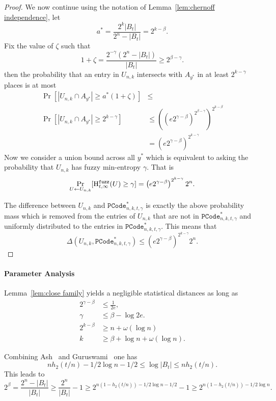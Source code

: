 \begin{proof}
\noindent
We now continue using the notation of Lemma~\ref{lem:chernoff independence}, let 
\[
a^* =\frac{2^k|B_t|}{2^n - |B_t|}=2^{k-\beta}.
\]
Fix the value of $\zeta$ such that 
\[1+\zeta = \frac{2^{-\gamma}(2^n - |B_t|)}{|B_t|} \ge 2^{\beta-\gamma}. \]
then the probability that an entry in $U_{n,k}$ intersects with $A_{y^*}$ in at least $2^{k-\gamma}$ places is at most 
\begin{align*}
\Pr[|U_{n,k} \cap A_{y^*}| \ge a^*(1+\zeta)] &\le \\
\Pr[| U_{n,k} \cap A_{y^*} | \ge 2^{k-\gamma}] &\le \left(\left(e2^{\gamma-\beta}\right)^{2^{\beta-\gamma}}\right)^{2^{k-\beta}} \\&= \left(e2^{\gamma-\beta}\right)^{2^{k-\gamma}}
\end{align*}
Now we consider a union bound across all $y^*$ which is equivalent to asking the probability that $U_{n,k}$ has fuzzy min-entropy $\gamma$.  That is
\[
\Pr_{U\leftarrow U_{n,k}}[\mathrm{H}^{\mathtt{fuzz}}_{t,\infty}(U)\ge \gamma] = \left(e2^{\gamma-\beta}\right)^{2^{k-\gamma}}2^n.
\]

The difference between $U_{n,k}$ and $\mathtt{PCode}_{n, k, t, \gamma}^{*}$ is exactly the above probability mass which is removed from the entries of $U_{n,k}$ that are not in $\mathtt{PCode}_{n, k, t, \gamma}^{*}$ and uniformly distributed to the entries in $\mathtt{PCode}_{n, k, t, \gamma}^{*}$.  This means that 
\[
\Delta(U_{n,k}, \mathtt{PCode}_{n, k, t, \gamma}^{*}) \le \left(e2^{\gamma-\beta}\right)^{2^{k-\gamma}}2^n.
\]
\end{proof}

\paragraph{Parameter Analysis}
 Lemma~\ref{lem:close family} yields a negligible statistical distances as long as 
\begin{align*}
2^{\gamma - \beta} &\le \frac{1}{2e},\\
 \gamma &\le \beta -\log{2e}.\\
2^{k-\beta}&\ge n+\omega(\log n)\\
k &\ge \beta + \log{n+ \omega(\log{n})}.
\end{align*}

\noindent
Combining Ash~\cite[Lemma 4.7.2, Equation 4.7.5, p. 115]{ash2012information} and Guruswami~\cite{venkatLecture} one has
\[ nh_2(t/n)  -1/2\log{n} - 1/2 \le \log{|B_t|} \le  nh_2(t/n).\]
This leads to 
\[
2^\beta = \frac{2^n - |B_t|}{|B_t|} \ge \frac{2^n}{|B_t|} -1 \ge 2^{n(1-h_2(t/n)) - 1/2 \log{n}-1/2} -1 \ge 2^{n(1-h_2(t/n)) - 1/2\log{n}}.
\]


